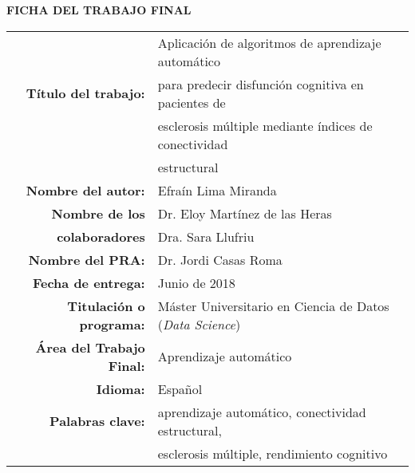 \begin{center}

\textbf{FICHA DEL TRABAJO FINAL}

\begin{table}[H]
\centering
\label{my-label}
\begin{tabular}{|r|l|}
\hline
\multirow{3}{*}{\textbf{Título del trabajo:}}          & Aplicación de algoritmos de aprendizaje automático   \\
                                                       & para predecir disfunción cognitiva en pacientes de   \\ 
                                                       & esclerosis múltiple mediante índices de conectividad \\
                                                       & estructural \\            
\hline
\textbf{Nombre del autor:}                             & Efraín Lima Miranda                                \\
\hline
\textbf{Nombre de los} & Dr. Eloy Martínez de las Heras                   \\ 
\textbf{colaboradores}  & Dra. Sara Llufriu                                 \\
                                                       \hline
\textbf{Nombre del PRA:}                               & Dr. Jordi Casas Roma                               \\ 
\hline
\textbf{Fecha de entrega:}                              & Junio de 2018 \\ 
\hline

\textbf{Titulación o programa:}                        & Máster Universitario en Ciencia de Datos (\textit{Data Science}) \\
\hline
\textbf{Área del Trabajo Final:}                       & Aprendizaje automático                                 \\ 
\hline
\textbf{Idioma:}                       & Español                                 \\ 

\hline
\textbf{Palabras clave:}                               & aprendizaje automático, conectividad estructural, \\
                                                       & esclerosis múltiple, rendimiento cognitivo \\ 
\hline

\end{tabular}
\end{table}

\null\vfill

\end{center}
\newpage
